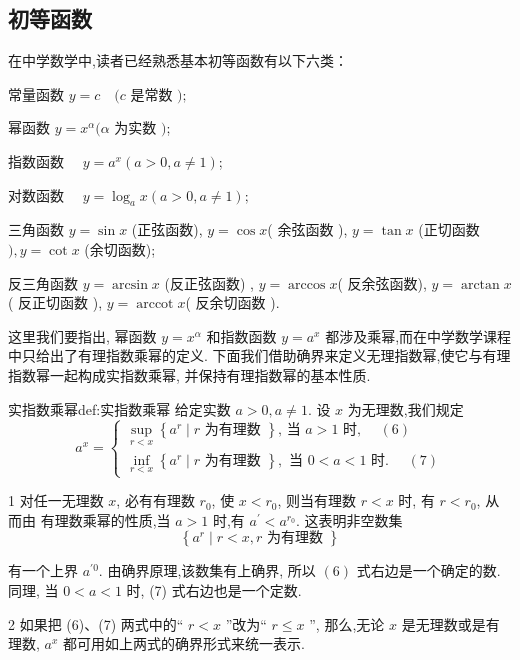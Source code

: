 \subsection{初等函数}

在中学数学中,读者已经熟悉基本初等函数有以下六类：

常量函数 $y=c \quad(c$ 是常数 $) ;$

幂函数 $y=x^{\alpha}(\alpha$ 为实数 $)$;

指数函数 $\quad y=a^{x}(a>0, a \neq 1)$;

对数函数 $\quad y=\log _{a} x(a>0, a \neq 1) ;$

三角函数 $y=\sin x$ (正弦函数), $y=\cos x$( 余弦函数 ), $y=\tan x$ (正切函数 $), y=\cot x$ (余切函数);

反三角函数 $y=\arcsin x$ (反正弦函数) , $y=\arccos x$( 反余弦函数), $y=\arctan x$( 反正切函数 ), $y=\operatorname{arccot} x$( 反余切函数 ).

这里我们要指出, 幂函数 $y=x^{\alpha}$ 和指数函数 $y=a^{x}$ 都涉及乘幂,而在中学数学课程中只给出了有理指数乘幂的定义. 下面我们借助确界来定义无理指数幂,使它与有理指数幂一起构成实指数乘幂, 并保持有理指数幂的基本性质.

\begin{definition}{实指数乘幂}{def:实指数乘幂}
	给定实数 $a>0, a \neq 1$. 设 $x$ 为无理数,我们规定
	\[
	a^{x}=\left\{\begin{array}{l}
		\sup _{r<x}\left\{a^{r} \mid r \text { 为有理数 }\right\} \text {, 当 } a>1 \text { 时, }\quad (6) \\
		\inf _{r<x}\left\{a^{r} \mid r \text { 为有理数 }\right\}, \text { 当 } 0<a<1 \text { 时. }\quad (7)
	\end{array}\right.
	\]
\end{definition}

\begin{remark}
	1 对任一无理数 $x$, 必有有理数 $r_{0}$, 使 $x<r_{0}$, 则当有理数 $r<x$ 时, 有 $r<r_{0}$, 从而由 有理数乘幂的性质,当 $a>1$ 时,有 $a^{\prime}<a^{r_{0}}$. 这表明非空数集
	\[
	\left\{a^{r} \mid r<x, r \text { 为有理数 }\right\}
	\]

	有一个上界 $a^{\prime 0} .$ 由确界原理,该数集有上确界, 所以 $(6)$ 式右边是一个确定的数.同理, 当 $0<a<1$ 时, (7) 式右边也是一个定数.
\end{remark}

\begin{remark}
	2 如果把 (6)、(7) 两式中的“ $r<x$ ”改为“ $r \leqslant x $ ”, 那么,无论 $x$ 是无理数或是有理数, $a^{x}$ 都可用如上两式的确界形式来统一表示.
\end{remark}

